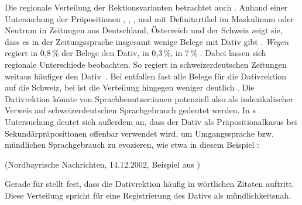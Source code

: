 Die regionale Verteilung der Rektionsvarianten betrachtet auch \citet{Elter2005}. 
Anhand einer Untersuchung der Pr{\"a}positionen \wegen, \waehrend, \dank,  und  mit Definitartikel im Maskulinum oder Neutrum in Zeitungen aus Deutschland, Österreich und der Schweiz zeigt sie, dass es in der Zeitungssprache insgesamt wenige Belege mit Dativ gibt \citep[s.][128]{Elter2005}. 
\textit{Wegen} regiert in 0,8\,\% der Belege den Dativ, \waehrend{} in 0,3\,\%, \dank{} in 7\,\% \citep[s.][128]{Elter2005}. 
Dabei lassen sich regionale Unterschiede beobachten. 
So regiert \dank{} in schweizerdeutschen Zeitungen weitaus h{\"a}ufiger den Dativ~\citep[s.][134]{Elter2005}. 
Bei \waehrend{} entfallen fast alle Belege für die Dativrektion auf die Schweiz, bei \wegen{} ist die Verteilung hingegen weniger deutlich \citep[s.][130--131]{Elter2005}.
Die Dativrektion könnte von Sprachbenutzer:innen potenziell also als indexikalischer Verweis auf schweizerdeutschen Sprachgebrauch gedeutet werden. 
In \citeauthor{Elter2005}s Untersuchung deutet sich außerdem an, dass der Dativ als Pr{\"a}positionalkasus bei Sekund{\"a}rpr{\"a}positionen offenbar verwendet wird, um Umgangssprache bzw. m{\"u}ndlichen Sprachgebrauch zu evozieren, wie etwa in diesem Beispiel \citep[s.][128--129]{Elter2005}:
\begin{exe}
\ex {} (Nordbayrische Nachrichten, 14.12.2002, Beispiel aus \citealp[129]{Elter2005})
\end{exe}
Gerade für \wegen{} stellt \citet[128]{Elter2005} fest, dass die Dativrektion häufig in wörtlichen Zitaten auftritt. 
Diese Verteilung spricht für eine Registrierung des Dativs als mündlichkeitsnah.

